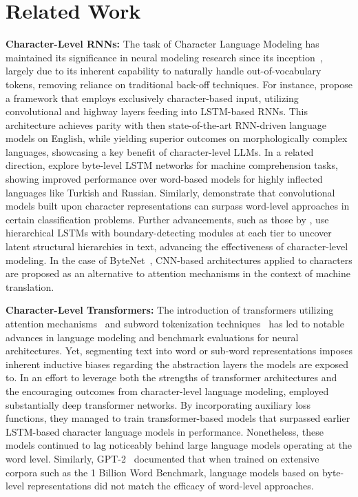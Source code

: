 \section{Related Work}
\label{section:related_work}

\textbf{Character-Level RNNs:} The task of Character Language Modeling has maintained its significance in neural modeling research since its inception~\citep{sutskever2011generating,mikolov2012subword,graves2013generating}, largely due to its inherent capability to naturally handle out-of-vocabulary tokens, removing reliance on traditional back-off techniques. For instance, \cite{kim2016character} propose a framework that employs exclusively character-based input, utilizing convolutional and highway layers feeding into LSTM-based RNNs. This architecture achieves parity with then state-of-the-art RNN-driven language models on English, while yielding superior outcomes on morphologically complex languages, showcasing a key benefit of character-level LLMs. In a related direction, \cite{kenter2018byte} explore byte-level LSTM networks for machine comprehension tasks, showing improved performance over word-based models for highly inflected languages like Turkish and Russian. Similarly, \cite{zhang2015character} demonstrate that convolutional models built upon character representations can surpass word-level approaches in certain classification problems. Further advancements, such as those by \citet{chung2019hierarchical}, use hierarchical LSTMs with boundary-detecting modules at each tier to uncover latent structural hierarchies in text, advancing the effectiveness of character-level modeling. In the case of ByteNet~\cite{kalchbrenner2016neural}, CNN-based architectures applied to characters are proposed as an alternative to attention mechanisms in the context of machine translation.

\textbf{Character-Level Transformers:} The introduction of transformers utilizing attention mechanisms~\citep{vaswani2017attention} and subword tokenization techniques~\citep{sennrich-etal-2016-neural} has led to notable advances in language modeling and benchmark evaluations for neural architectures. Yet, segmenting text into word or sub-word representations imposes inherent inductive biases regarding the abstraction layers the models are exposed to. In an effort to leverage both the strengths of transformer architectures and the encouraging outcomes from character-level language modeling, \citet{al2019character} employed substantially deep transformer networks. By incorporating auxiliary loss functions, they managed to train transformer-based models that surpassed earlier LSTM-based character language models in performance. Nonetheless, these models continued to lag noticeably behind large language models operating at the word level. Similarly, GPT-2~\citep{radfordgpt2} documented that when trained on extensive corpora such as the 1 Billion Word Benchmark, language models based on byte-level representations did not match the efficacy of word-level approaches.

